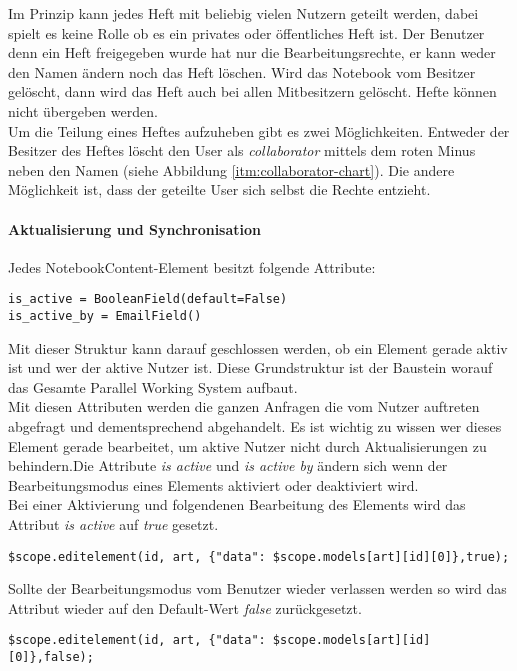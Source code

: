 
Im Prinzip kann jedes Heft mit beliebig vielen Nutzern geteilt werden, dabei spielt es keine Rolle ob es ein privates oder öffentliches Heft ist. 
Der Benutzer denn ein Heft freigegeben wurde hat nur die Bearbeitungsrechte, er kann weder den Namen ändern noch das Heft löschen. Wird das Notebook vom Besitzer gelöscht, dann wird das Heft auch bei allen Mitbesitzern gelöscht. Hefte können nicht übergeben werden.
\\
Um die Teilung eines Heftes aufzuheben gibt es zwei Möglichkeiten. Entweder der Besitzer des Heftes löscht den User als \textit{collaborator} mittels dem roten Minus neben den Namen (siehe Abbildung \ref{itm:collaborator-chart}). Die andere Möglichkeit ist, dass der geteilte User sich selbst die Rechte entzieht.
\paragraph{Aktualisierung und Synchronisation}
Jedes NotebookContent-Element besitzt folgende Attribute:
\begin{lstlisting}[caption={Parallel Working System Attribute}]
is_active = BooleanField(default=False)
is_active_by = EmailField()
\end{lstlisting}
Mit dieser Struktur kann darauf geschlossen werden, ob ein Element gerade aktiv ist und wer der aktive Nutzer ist. Diese Grundstruktur ist der Baustein worauf das Gesamte Parallel Working System aufbaut.\\
Mit diesen Attributen werden die ganzen Anfragen die vom Nutzer auftreten abgefragt und dementsprechend abgehandelt. Es ist wichtig zu wissen wer dieses Element gerade bearbeitet, um aktive Nutzer nicht durch Aktualisierungen zu behindern.Die Attribute \textit{is active} und \textit{is active by} ändern sich wenn der Bearbeitungsmodus eines Elements aktiviert oder deaktiviert wird.\\

Bei einer Aktivierung und folgendenen Bearbeitung des Elements wird das Attribut \textit{is active} auf \textit{true} gesetzt.
\begin{lstlisting}[caption={Bearbeitungsmodus true - PWS}]
$scope.editelement(id, art, {"data": $scope.models[art][id][0]},true);
\end{lstlisting}

Sollte der Bearbeitungsmodus vom Benutzer wieder verlassen werden so wird das Attribut wieder auf den Default-Wert \textit{false} zurückgesetzt.
\begin{lstlisting}[caption={Bearbeitungsmodus false - PWS}]
$scope.editelement(id, art, {"data": $scope.models[art][id][0]},false);
\end{lstlisting}

